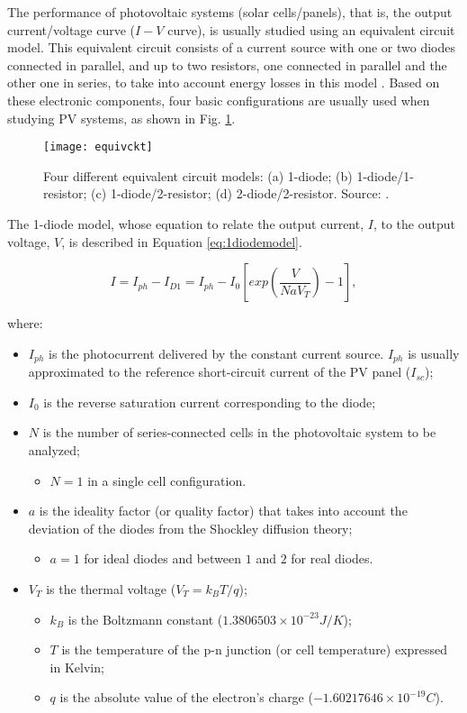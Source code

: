 The performance of photovoltaic systems (solar cells/panels), that is, the output current/voltage curve ($I-V$ curve), is usually studied using an equivalent circuit model. This equivalent circuit consists of a current source with one or two diodes connected in parallel, and up to two resistors, one connected in parallel and the other one in series, to take into account energy losses in this model \cite{Cubas}. Based on these electronic components, four basic configurations are usually used when studying PV systems, as shown in Fig. \ref{fig:equivckt}. 

\begin{figure}[h]
\texttt{[image: equivckt]}
\centering
\caption{Four different equivalent circuit models: (a) 1-diode; (b) 1-diode/1-resistor; (c) 1-diode/2-resistor; (d) 2-diode/2-resistor. Source: \cite{Cubas}.}
\label{fig:equivckt}
\end{figure}
 
The 1-diode model, whose equation to relate the output current, $I$, to the output voltage, $V$, is described in Equation \ref{eq:1diodemodel}. 

\begin{equation}
\label{eq:1diodemodel}
I = I_{ph}-I_{D1}=I_{ph}-I_{0}\left[ exp \left( \dfrac{V}{NaV_{T}} \right) -1 \right], 
\end{equation}

\noindent where:
\begin{itemize}
\item $I_{ph}$ is the photocurrent delivered by the constant current source. $I_{ph}$ is usually approximated to the reference short-circuit current of the PV panel ($I_{sc}$); 
\item $ I_{0} $ is the reverse saturation current corresponding to the diode; 
\item $ N $ is the number of series-connected cells in the photovoltaic system to be analyzed;
	\begin{itemize}
	\item $ N=1 $ in a single cell configuration. 	
	\end{itemize}	  
\item $ a $ is the ideality factor (or quality factor) that takes into account the deviation of the diodes from the Shockley diffusion theory; 
	\begin{itemize}
	\item $a=1$ for ideal diodes and between $ 1 $ and $ 2 $ for real diodes. 	
	\end{itemize}
\item $V_{T}$ is the thermal voltage ($ V_{T}=k_{B}T/q $);
	\begin{itemize}
	\item $ k_{B} $ is the Boltzmann constant ($ 1.3806503\times10^{-23}J/K $); 
	\item $ T $ is the temperature of the p-n junction (or cell temperature) expressed in Kelvin; 
	\item $ q $ is the absolute value of the electron's charge ($ -1.60217646\times10^{-19}C $).	
	\end{itemize}	 
\end{itemize}


